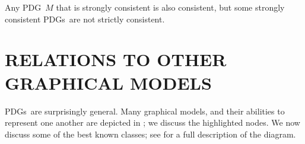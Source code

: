 \documentclass{article}
\newcommand{\MN}{PDG}
\newcommand{\MNs}{\MN s}
\numberwithin{equation}{section}
\begin{document}
\begin{notfocus}
{\begin{vfull}
	\begin{prop}
		Any \MN\ $M$ that is strongly consistent is also consistent, but some strongly consistent \MNs\ are not strictly consistent.
	\end{prop}




	\end{vfull}



	\section{RELATIONS TO OTHER GRAPHICAL MODELS}\label{sec:other-graphical-models}
	
	\MNs\ are surprisingly general. Many graphical models, and their abilities to represent one another are depicted in ; we discuss the highlighted nodes. We now discuss some of the best known classes; see  for a full description of the diagram.

	\usetikzlibrary{decorations.markings}	
	\begin{figure*}[t]
		\centering
\end{figure*}}
\end{notfocus}
\end{document}
